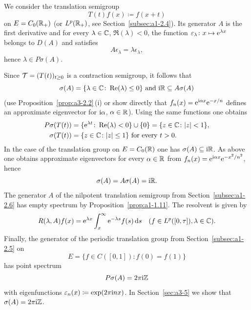 \begin{example}\label{ex:a3-2.4}

We consider the translation semigroup
\[
T(t)f(x) \coloneq f(x+t)
\]
on $E = C_{0}(\mathbb{R}_{+})$ (or $L^{p}(\mathbb{R}_{+})$, see Section~\ref{subsec:a1-2.4}).
Its generator $A$ is the first derivative and for every $\lambda \in \mathbb{C}$, $\Re(\lambda) < 0$, the function $\epsilon_{\lambda} \colon x \mapsto \eu^{\lambda x}$ belongs to $D(A)$ and satisfies
\[
A\epsilon_{\lambda} = \lambda\epsilon_{\lambda} ,
\]
hence $\lambda \in P\sigma(A)$.

Since $\TT = (T(t))_{t \geq 0}$ is a contraction semigroup, it follows that 
%
\[
	 \text{$\sigma(A) = \{\lambda \in \C \colon \Re(\lambda) \leq 0\}$  and $\im\R \subseteq A\sigma(A)$}  
\]
%
(use Proposition~\ref{prop:a3-2.2}\,(i) or show directly that $f_{n}(x) = \mathrm{e}^{ \mathrm{i}\alpha x}\mathrm{e}^{-x/n}$ defines an approximate eigenvector for $\mathrm{i}\alpha$, $\alpha \in \mathbb{R}$).
Using the same functions one obtains
\begin{align*}
	P\sigma(T(t)) &= \{\eu^{\lambda t} \colon \Re(\lambda) < 0\} \cup \{0\} = \{z \in \C \colon |z| < 1\} ,\\
	\sigma(T(t)) &= \{z \in \C \colon |z| \leq 1\} \text{ for every } t > 0 .
\end{align*}
In the case of the translation group on $E = C_{0}(\mathbb{R})$ one has $\sigma(A) \subseteq \mathrm{i}\mathbb{R}$.
As above one obtains approximate eigenvectors for every $\alpha \in \mathbb{R}$ from 
$f_{n}(x) = \mathrm{e}^{\mathrm{i}\alpha x}\mathrm{e}^{-x^{2}/n^{2}}$, hence
\[
\sigma(A) = A\sigma(A) = \mathrm{i}\mathbb{R} .
\]
The generator $A$ of the nilpotent translation semigroup from Section~\ref{subsec:a1-2.6} has empty spectrum by Proposition~\ref{prop:a1-1.11}.
The resolvent is given by
\[
R(\lambda,A)f(x) = \mathrm{e}^{\lambda x}\int_{x}^{\infty}\mathrm{e}^{-\lambda s}f(s)  \mathop{}\!\mathrm{d}{s} \quad (f \in L^{p}([0,\tau]), \lambda \in \mathbb{C}) .
\]
Finally, the generator of the periodic translation group from Section~\ref{subsec:a1-2.5} on
\[
	E = \{f \in C([0,1]) \colon f(0) = f(1)\}
\]
%
has point spectrum
\[
P\sigma(A) = 2\pi \mathrm{i}\mathbb{Z}
\]
with eigenfunctions $\epsilon_{n}(x) \coloneq \exp(2\pi \im n x)$.
In Section~\ref{sec:a3-5} we show that $\sigma(A) = 2\pi \mathrm{i}\mathbb{Z}$.
\end{example}
